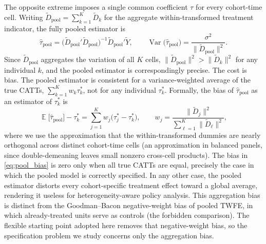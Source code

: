 \documentclass[margin=5in, 12pt]{article}
\DeclareMathOperator{\E}{\mathbb{E}}
\DeclareMathOperator{\Var}{Var}
\newcommand{\1}{\mathbbm{1}}
\begin{document}
The opposite extreme imposes a single common coefficient $\tau$ for every
cohort-time cell.
Writing $\tilde{D}_{\text{pool}} = \sum_{k=1}^K \tilde{D}_k$ for the
aggregate within-transformed treatment indicator, the fully pooled
estimator is
\begin{equation}
  \hat\tau_{\text{pool}}
  = \bigl(\tilde{D}_{\text{pool}}'\tilde{D}_{\text{pool}}\bigr)^{-1}
    \tilde{D}_{\text{pool}}'\tilde Y,
  \qquad
  \Var\!\bigl(\hat\tau_{\text{pool}}\bigr)
  = \frac{\sigma^2}{\bigl\|\tilde{D}_{\text{pool}}\bigr\|^2}.
  \label{eq:pool_var}
\end{equation}
Since $\tilde{D}_{\text{pool}}$ aggregates the variation of all $K$ cells,
$\|\tilde{D}_{\text{pool}}\|^2 > \|\tilde{D}_k\|^2$ for any individual
$k$, and the pooled estimator is correspondingly precise.
The cost is bias. The pooled estimator is consistent for a variance-weighted
average of the true CATTs, $\sum_{k=1}^K w_k \tau_k^*$, not for any individual $\tau_k^*$.
Formally, the bias of $\hat\tau_{\text{pool}}$ as an estimator of $\tau_k^*$ is
\begin{equation}
  \E\bigl[\hat\tau_{\text{pool}}\bigr] - \tau_k^*
  = \sum_{j=1}^K w_j\bigl(\tau_j^* - \tau_k^*\bigr),
  \qquad
  w_j = \frac{\|\tilde{D}_j\|^2}{\sum_{\ell=1}^K \|\tilde{D}_\ell\|^2},
  \label{eq:pool_bias}
\end{equation}
where we use the approximation that the within-transformed dummies are
nearly orthogonal across distinct cohort-time cells (an approximation in
balanced panels, since double-demeaning leaves small nonzero cross-cell products).
The bias in \eqref{eq:pool_bias} is zero only when all true CATTs are equal, precisely the case in which the pooled model is correctly specified. In any other case, the pooled estimator distorts every cohort-specific treatment effect toward a global average, rendering it useless for heterogeneity-aware policy analysis. This aggregation bias is distinct from the Goodman--Bacon negative-weight bias of pooled TWFE, in which already-treated units serve as controls (the forbidden comparison). The flexible starting point adopted here removes that negative-weight bias, so the specification problem we study concerns only the aggregation bias.
\end{document}
